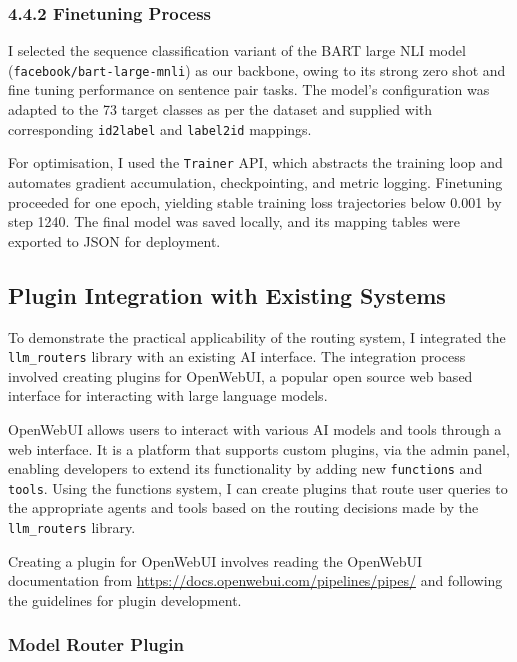 \subsubsection{4.4.2 Finetuning Process}
I selected the sequence classification variant of the BART large NLI model (\texttt{facebook/\newline bart-large-mnli}) as our backbone, owing to its strong zero shot and fine tuning performance on sentence pair tasks. The model's configuration was adapted to the 73 target classes as per the dataset and supplied with corresponding \texttt{id2label} and \texttt{label2id} mappings.

For optimisation, I used the \texttt{Trainer} API, which abstracts the training loop and automates gradient accumulation, checkpointing, and metric logging. Finetuning proceeded for one epoch, yielding stable training loss trajectories below 0.001 by step 1240. The final model was saved locally, and its mapping tables were exported to JSON for deployment.

\subsection{Plugin Integration with Existing Systems}

To demonstrate the practical applicability of the routing system, I integrated the \texttt{llm\_routers} library with an existing AI interface. The integration process involved creating plugins for OpenWebUI, a popular open source web based interface for interacting with large language models.

OpenWebUI allows users to interact with various AI models and tools through a web interface. It is a platform that supports custom plugins, via the admin panel, enabling developers to extend its functionality by adding new \texttt{functions} and \texttt{tools}. Using the functions system, I can create plugins that route user queries to the appropriate agents and tools based on the routing decisions made by the \texttt{llm\_routers} library.

Creating a plugin for OpenWebUI involves reading the OpenWebUI documentation from \url{https://docs.openwebui.com/pipelines/pipes/} and following the guidelines for plugin development.

\subsubsection{Model Router Plugin}

